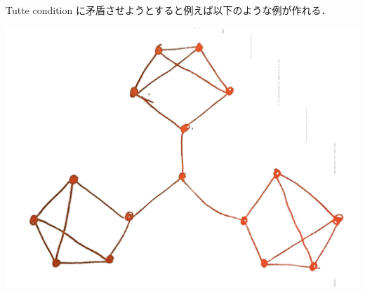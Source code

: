 \subsection{}
Tutte condition に矛盾させようとすると例えば以下のような例が作れる．

\begin{center}
 \includegraphics[width=.5\linewidth]{chap2/2_21.png}
\end{center}